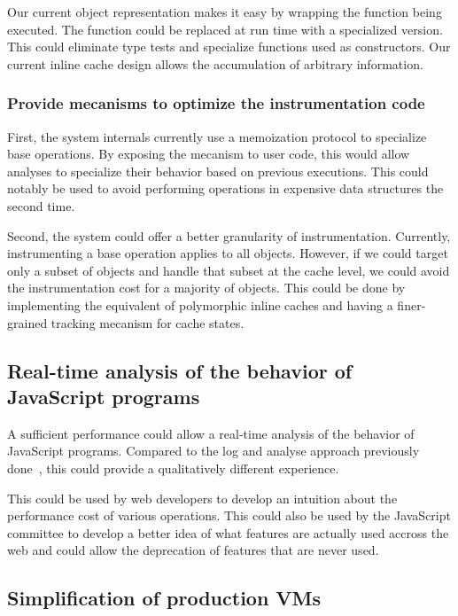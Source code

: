 Our current object representation makes it easy by wrapping the function being
executed.  The function could be replaced at run time with a specialized
version. This could eliminate type tests and specialize functions used as
constructors. Our current inline cache design allows the accumulation of
arbitrary information.

\subsubsection{Provide mecanisms to optimize the instrumentation code}

First, the system internals currently use a memoization protocol to specialize base
operations. By exposing the mecanism to user code, this would allow analyses to
specialize their behavior based on previous executions. This could notably be
used to avoid performing operations in expensive data structures the second
time.

Second, the system could offer a better granularity of instrumentation.
Currently, instrumenting a base operation applies to all objects. However, if
we could target only a subset of objects and handle that subset at the cache
level, we could avoid the instrumentation cost for a majority of objects. This
could be done by implementing the equivalent of polymorphic inline caches and
having a finer-grained tracking mecanism for cache states.

\subsection{Real-time analysis of the behavior of JavaScript programs}

A sufficient performance could allow a real-time analysis of the behavior of
JavaScript programs. Compared to the log and analyse approach previously
done~\cite{behavior_js}, this could provide a qualitatively different
experience.

This could be used by web developers to develop an intuition about the
performance cost of various operations. This could also be used by the
JavaScript committee to develop a better idea of what features are actually
used accross the web and could allow the deprecation of features that are never
used.

\subsection{Simplification of production VMs}

